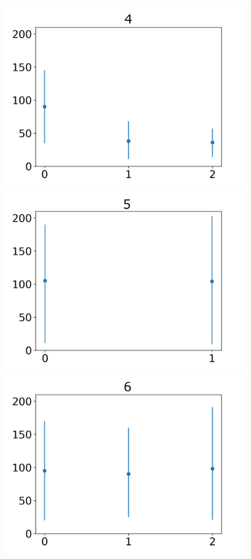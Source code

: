 \documentclass[journal]{IEEEtran}
\begin{document}
{{\begin{figure}[h!]
\begin{subfigure}{0.5\textwidth}
 \includegraphics[scale=0.27]{Images/Average_steps/d.png}
 \centering
  \includegraphics[scale=0.27]{Images/Average_steps/e.png}
  \includegraphics[scale=0.27]{Images/Average_steps/f.png}

\end{subfigure}
\end{figure}}}
\end{document}
